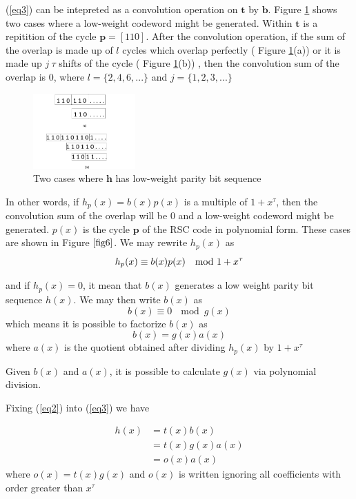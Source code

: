 \documentclass[fontsize=12pt]{article}
\begin{document}
 (\ref{eq3}) can be intepreted as a convolution operation on $\textbf{t}$ by $\textbf{b}$. Figure \ref{fig6} shows two cases where a low-weight codeword might be generated. Within $\textbf{t}$ is a repitition of the cycle $\textbf{p}=[1 1 0]$. After the convolution operation, if the sum of the overlap is made up of $l$ cycles which overlap perfectly ( Figure \ref{fig6}(a)) or it is made up $j~\tau$ shifts of the cycle ( Figure \ref{fig6}(b)) , then the convolution sum of the overlap is $0$, where $l=\{2,4,6,...\}$ and $j=\{1,2,3,...\}$
 
 
 \begin{figure}[h]
\centering
		\includegraphics[width=0.35\textwidth]{overlap.png}
		\caption{Two cases where $\textbf{h}$ has low-weight parity bit sequence}
		\label{fig6}
		\end{figure}
		

 In other words, if $ h_p(x)=b(x)p(x)$ is a multiple of $1+ x^{\tau}$, then the convolution sum of the overlap will be $0$ and a low-weight codeword might be generated. $p(x)$ is the cycle $\textbf{p}$ of the  RSC code in polynomial form.
These cases are shown in Figure $\ref{fig6}$.
We may rewrite $ h_p(x)$ as
 \begin{equation}
 h_p(x)  \equiv b(x)p(x) ~\mod{ 1+ x^{\tau}}\\
 \label{eq1}
 \end{equation}

 
and if $h_p(x) = 0$, it mean that $b(x)$ generates a low weight parity bit sequence $h(x)$.  We may then write $b(x)$ as 
 $$b(x) \equiv  0 ~\mod{ g(x)} $$ which means it is possible to factorize $b(x)$ as 
 \begin{equation}
 b(x) =g(x)a(x)
 \label{eq2}
 \end{equation}
 where $a(x)$ is the quotient obtained after dividing $h_p(x)$ by $1+ x^{\tau}$
 
 Given $b(x)$ and $a(x)$, it is possible to calculate $g(x)$ via polynomial division.
 
 Fixing (\ref{eq2}) into (\ref{eq3}) we have 
 
 \begin{equation}
 \begin{split}
 h(x)&=t(x)b(x)\\
 &=t(x)g(x)a(x)\\
 & = o(x)a(x)
 \end{split}
 \label{eq4}
 \end{equation}
 where  $o(x)=t(x)g(x)$ and $o(x)$ is written ignoring all coefficients with order greater than $x^{\tau}$
 
\end{document}
